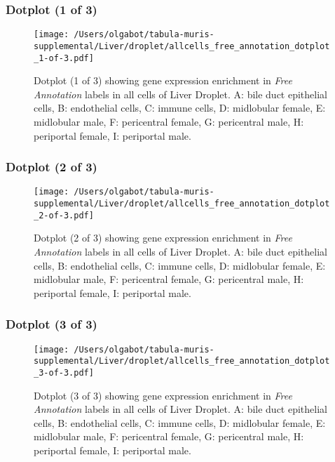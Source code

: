 \clearpage

\subsubsection{Dotplot (1 of 3)}
\begin{figure}[h]
\centering
\texttt{[image: /Users/olgabot/tabula-muris-supplemental/Liver/droplet/allcells\_free\_annotation\_dotplot\_1-of-3.pdf]}

\caption{ Dotplot (1 of 3)  showing gene expression enrichment in \emph{Free Annotation} labels in all cells of Liver Droplet. A: bile duct epithelial cells, B: endothelial cells, C: immune cells, D: midlobular female, E: midlobular male, F: pericentral female, G: pericentral male, H: periportal female, I: periportal male.}
\end{figure}


\clearpage

\subsubsection{Dotplot (2 of 3)}
\begin{figure}[h]
\centering
\texttt{[image: /Users/olgabot/tabula-muris-supplemental/Liver/droplet/allcells\_free\_annotation\_dotplot\_2-of-3.pdf]}

\caption{ Dotplot (2 of 3)  showing gene expression enrichment in \emph{Free Annotation} labels in all cells of Liver Droplet. A: bile duct epithelial cells, B: endothelial cells, C: immune cells, D: midlobular female, E: midlobular male, F: pericentral female, G: pericentral male, H: periportal female, I: periportal male.}
\end{figure}


\clearpage

\subsubsection{Dotplot (3 of 3)}
\begin{figure}[h]
\centering
\texttt{[image: /Users/olgabot/tabula-muris-supplemental/Liver/droplet/allcells\_free\_annotation\_dotplot\_3-of-3.pdf]}

\caption{ Dotplot (3 of 3)  showing gene expression enrichment in \emph{Free Annotation} labels in all cells of Liver Droplet. A: bile duct epithelial cells, B: endothelial cells, C: immune cells, D: midlobular female, E: midlobular male, F: pericentral female, G: pericentral male, H: periportal female, I: periportal male.}
\end{figure}


